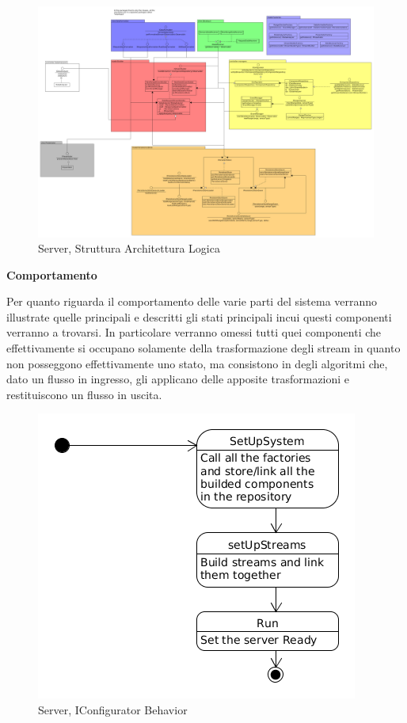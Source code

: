 \begin{figure}
\centering
\includegraphics[width=\textwidth]{Figures/LogicArchitecture/Server/Structure}
\caption{Server, Struttura Architettura Logica}
\end{figure}

\afterpage{\clearpage}

\newpage

\begin{center}
\textbf{Comportamento}
\end{center}

Per quanto riguarda il comportamento delle varie parti del sistema verranno illustrate quelle principali e descritti gli stati principali incui questi componenti verranno a trovarsi. In particolare verranno omessi tutti quei componenti che effettivamente si occupano solamente della trasformazione degli stream in quanto non posseggono effettivamente uno stato, ma consistono in degli algoritmi che, dato un flusso in ingresso, gli applicano delle apposite trasformazioni e restituiscono un flusso in uscita.

\begin{figure}[h]
\centering
\includegraphics[scale=0.5]{Figures/LogicArchitecture/Server/IConfiguratorBehavior}
\caption{Server, IConfigurator Behavior}
\end{figure}

